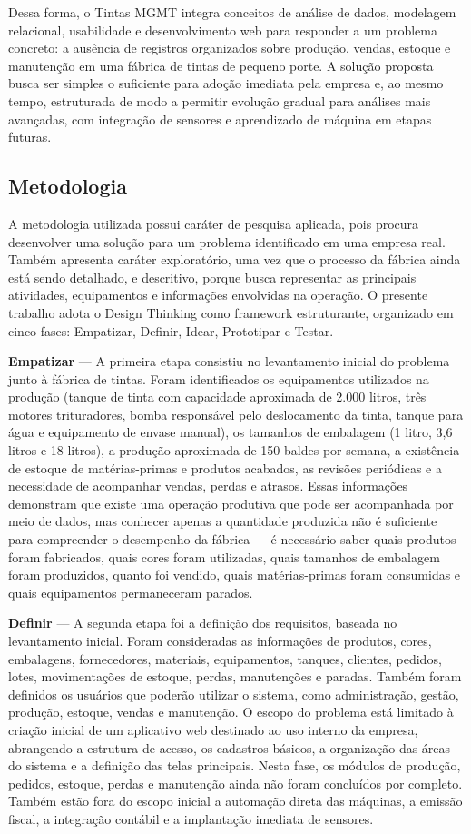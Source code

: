 \documentclass[12pt,a4paper]{article}
\begin{document}
Dessa forma, o Tintas MGMT integra conceitos de análise de dados, modelagem relacional, usabilidade e desenvolvimento web para responder a um problema concreto: a ausência de registros organizados sobre produção, vendas, estoque e manutenção em uma fábrica de tintas de pequeno porte. A solução proposta busca ser simples o suficiente para adoção imediata pela empresa e, ao mesmo tempo, estruturada de modo a permitir evolução gradual para análises mais avançadas, com integração de sensores e aprendizado de máquina em etapas futuras.

\subsection{Metodologia}
A metodologia utilizada possui caráter de pesquisa aplicada, pois procura desenvolver uma solução para um problema identificado em uma empresa real. Também apresenta caráter exploratório, uma vez que o processo da fábrica ainda está sendo detalhado, e descritivo, porque busca representar as principais atividades, equipamentos e informações envolvidas na operação. O presente trabalho adota o Design Thinking como framework estruturante, organizado em cinco fases: Empatizar, Definir, Idear, Prototipar e Testar.

\textbf{Empatizar} — A primeira etapa consistiu no levantamento inicial do problema junto à fábrica de tintas. Foram identificados os equipamentos utilizados na produção (tanque de tinta com capacidade aproximada de 2.000 litros, três motores trituradores, bomba responsável pelo deslocamento da tinta, tanque para água e equipamento de envase manual), os tamanhos de embalagem (1 litro, 3,6 litros e 18 litros), a produção aproximada de 150 baldes por semana, a existência de estoque de matérias-primas e produtos acabados, as revisões periódicas e a necessidade de acompanhar vendas, perdas e atrasos. Essas informações demonstram que existe uma operação produtiva que pode ser acompanhada por meio de dados, mas conhecer apenas a quantidade produzida não é suficiente para compreender o desempenho da fábrica — é necessário saber quais produtos foram fabricados, quais cores foram utilizadas, quais tamanhos de embalagem foram produzidos, quanto foi vendido, quais matérias-primas foram consumidas e quais equipamentos permaneceram parados.

\textbf{Definir} — A segunda etapa foi a definição dos requisitos, baseada no levantamento inicial. Foram consideradas as informações de produtos, cores, embalagens, fornecedores, materiais, equipamentos, tanques, clientes, pedidos, lotes, movimentações de estoque, perdas, manutenções e paradas. Também foram definidos os usuários que poderão utilizar o sistema, como administração, gestão, produção, estoque, vendas e manutenção. O escopo do problema está limitado à criação inicial de um aplicativo web destinado ao uso interno da empresa, abrangendo a estrutura de acesso, os cadastros básicos, a organização das áreas do sistema e a definição das telas principais. Nesta fase, os módulos de produção, pedidos, estoque, perdas e manutenção ainda não foram concluídos por completo. Também estão fora do escopo inicial a automação direta das máquinas, a emissão fiscal, a integração contábil e a implantação imediata de sensores.
\end{document}
